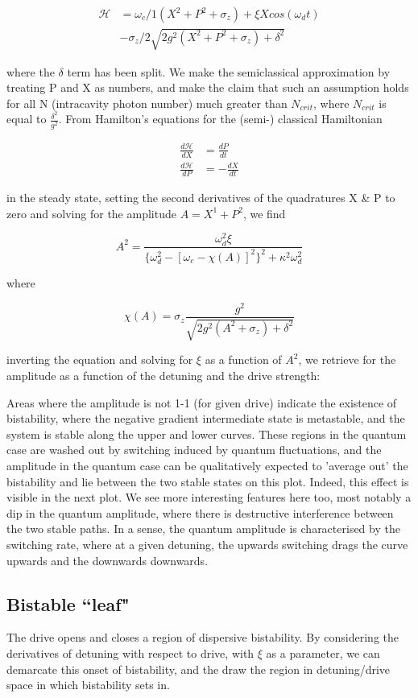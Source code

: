 \begin{align}
        \mathscr{H} &= \omega_c/1 (X^2 + P^2 + \sigma_z) + \xi X cos(\omega_d t)\\
                    & - \sigma_z /2 \sqrt{2g^2(X^2+P^2+\sigma_z) + \delta^2}
\end{align}

where the $\delta$ term has been split. We make the semiclassical approximation by treating P and X as numbers, and make the claim that such an assumption holds for all N (intracavity photon number) much greater than $N_{crit}$, where $N_{crit}$ is equal to $\frac{\delta^2}{g^2}$.
From Hamilton's equations for the (semi-) classical Hamiltonian

\begin{align}
        \frac{d\mathscr{H}}{dX} &= \frac{dP}{dt}\\
        \frac{d\mathscr{H}}{dP} &= -\frac{dX}{dt}
\end{align}

in the steady state, setting the second derivatives of the quadratures X \& P to zero and solving for the amplitude $A = X^1 + P^2$, we find

\begin{equation}
        A^2 = \frac{\omega_d^2\xi}{\{\omega_d^2 - [\omega_c - \chi (A) ]^2 \}^2+ \kappa^2 \omega_d^2}
\end{equation}

where

\begin{equation}
        \chi(A) = \sigma_z \frac{g^2}{\sqrt{2g^2(A^2 + \sigma_z) + \delta^2}}
\end{equation}

inverting the equation and solving for $\xi$ as a function of $A^2$, we retrieve for the amplitude as a function of the detuning and the drive strength:

Areas where the amplitude is not 1-1 (for given drive) indicate the existence of bistability, where the negative gradient intermediate state is metastable, and the system is stable along the upper and lower curves. These regions in the quantum case are washed out by switching induced by quantum fluctuations, and the amplitude in the quantum case can be qualitatively expected to 'average out' the bistability and lie between the two stable states on this plot. Indeed, this effect is visible in the next plot. We see more interesting features here too, most notably a dip in the quantum amplitude, where there is destructive interference between the two stable paths. In a sense, the quantum amplitude is characterised by the switching rate, where at a given detuning, the upwards switching drags the curve upwards and the downwards downwards.

\subsection{Bistable ``leaf"}
The drive opens and closes a region of dispersive bistability. By considering the derivatives of detuning with respect to drive, with $\xi$ as a parameter, we can demarcate this onset of bistability, and the draw the region in detuning/drive space in which bistability sets in.

